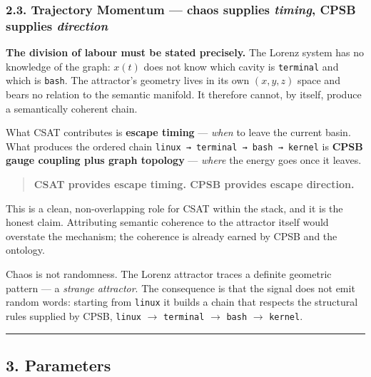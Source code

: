 \documentclass[
  11pt,
  a4paper,
]{article}
\begin{document}
\subsubsection{\texorpdfstring{2.3. Trajectory Momentum --- chaos
supplies \emph{timing}, CPSB supplies
\emph{direction}}{2.3. Trajectory Momentum --- chaos supplies timing, CPSB supplies direction}}\label{trajectory-momentum-chaos-supplies-timing-cpsb-supplies-direction}

\textbf{The division of labour must be stated precisely.} The Lorenz
system has no knowledge of the graph: \(x(t)\) does not know which
cavity is \texttt{terminal} and which is \texttt{bash}. The attractor's
geometry lives in its own \((x,y,z)\) space and bears no relation to the
semantic manifold. It therefore cannot, by itself, produce a
semantically coherent chain.

What CSAT contributes is \textbf{escape timing} --- \emph{when} to leave
the current basin. What produces the ordered chain
\texttt{linux\ →\ terminal\ →\ bash\ →\ kernel} is \textbf{CPSB gauge
coupling plus graph topology} --- \emph{where} the energy goes once it
leaves.

\begin{quote}
\textbf{CSAT provides escape timing. CPSB provides escape direction.}
\end{quote}

This is a clean, non-overlapping role for CSAT within the stack, and it
is the honest claim. Attributing semantic coherence to the attractor
itself would overstate the mechanism; the coherence is already earned by
CPSB and the ontology.

Chaos is not randomness. The Lorenz attractor traces a definite
geometric pattern --- a \emph{strange attractor}. The consequence is
that the signal does not emit random words: starting from \texttt{linux}
it builds a chain that respects the structural rules supplied by CPSB,
\texttt{linux} \(\rightarrow\) \texttt{terminal} \(\rightarrow\)
\texttt{bash} \(\rightarrow\) \texttt{kernel}.

\begin{center}\rule{0.5\linewidth}{0.5pt}\end{center}

\subsection{3. Parameters}\label{parameters}
\end{document}
